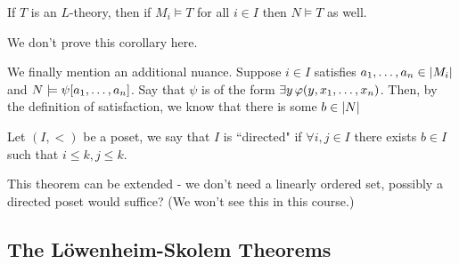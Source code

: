\begin{boxcorollary}
    If $T$ is an $L$-theory, then if $M_i \models T$ for all $i \in I$ then $N \models T$ as well.
\end{boxcorollary}

We don't prove this corollary here.

We finally mention an additional nuance. Suppose $i \in I$ satisfies $a_1, \ldots, a_n \in \left\lvert M_i \right\rvert$ and $N \models \psi\!\left[ a_1, \ldots, a_n \right]$. Say that $\psi$ is of the form $\exists y \, \varphi\!\left( y, x_1, \ldots, x_n \right)$. Then, by the definition of satisfaction, we know that there is some $b \in \left\lvert N \right\rvert$

\begin{boxdefinition}
    Let $(I, <)$ be a poset, we say that $I$ is ``directed" if $\forall i, j\in I$ there exists $b\in I$ such that $i\leq k, j\leq k$.
\end{boxdefinition}
\begin{remark}
    This theorem can be extended - we don't need a linearly ordered set, possibly a directed poset would suffice? (We won't see this in this course.)
\end{remark}


\subsection{The Löwenheim-Skolem Theorems}